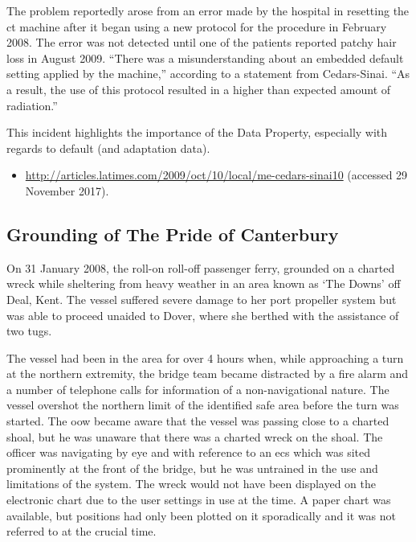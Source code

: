 The problem reportedly arose from an error made by the hospital in resetting the \gls{ct} machine after it began using a new protocol for the procedure in February 2008. The error was not detected until one of the patients reported patchy hair loss in August 2009. ``There was a misunderstanding about an embedded default setting applied by the machine,'' according to a statement from Cedars-Sinai. ``As a result, the use of this protocol resulted in a higher than expected amount of radiation.'' 

This incident highlights the importance of the  Data Property, especially with regards to default (and \gls{adaptation data}).

\begin{samepage}
\begin{itemize}
  \item \raggedright{\href{http://articles.latimes.com/2009/oct/10/local/me-cedars-sinai10}{http://articles.latimes.com/2009/oct/10/local/me-cedars-sinai10} (accessed 29 November 2017).}
\end{itemize}
\end{samepage}


\subsection{Grounding of The Pride of Canterbury} \label{bkm:incacc:canterbury}
On 31 January 2008, the roll-on roll-off passenger ferry,  grounded on a charted wreck while sheltering from heavy weather in an area known as `The Downs' off Deal, Kent. The vessel suffered severe damage to her port propeller system but was able to proceed unaided to Dover, where she berthed with the assistance of two tugs.

The vessel had been in the area for over 4 hours when, while approaching a turn at the northern extremity, the bridge team became distracted by a fire alarm and a number of telephone calls for \gls{information} of a non-navigational nature. The vessel overshot the northern limit of the identified safe area before the turn was started. The \gls{oow} became aware that the vessel was passing close to a charted shoal, but he was unaware that there was a charted wreck on the shoal. The officer was navigating by eye and with reference to an \gls{ecs} which was sited prominently at the front of the bridge, but he was untrained in the use and limitations of the system. The wreck would not have been displayed on the electronic chart due to the user settings in use at the time. A paper chart was available, but positions had only been plotted on it sporadically and it was not referred to at the crucial time.

